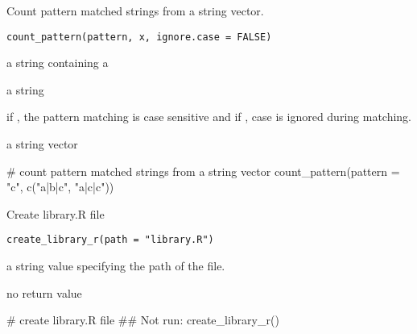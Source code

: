 \documentclass[letterpaper]{book}
\begin{document}
%
\begin{Description}
Count pattern matched strings from a string vector.
\end{Description}
%
\begin{Usage}
\begin{verbatim}
count_pattern(pattern, x, ignore.case = FALSE)
\end{verbatim}
\end{Usage}
%
\begin{Arguments}
\begin{ldescription}
\item[\code{pattern}] a string containing a 

\item[\code{x}] a string

\item[\code{ignore.case}] if , the pattern matching is case sensitive and if , case is ignored during matching.
\end{ldescription}
\end{Arguments}
%
\begin{Value}
a string vector
\end{Value}
%
\begin{Examples}
\begin{ExampleCode}
# count pattern matched strings from a string vector
count_pattern(pattern = "c", c("a|b|c", "a|c|c"))

\end{ExampleCode}
\end{Examples}
%
\begin{Description}
Create library.R file
\end{Description}
%
\begin{Usage}
\begin{verbatim}
create_library_r(path = "library.R")
\end{verbatim}
\end{Usage}
%
\begin{Arguments}
\begin{ldescription}
\item[\code{path}] a string value specifying the path of the file.
\end{ldescription}
\end{Arguments}
%
\begin{Value}
no return value
\end{Value}
%
\begin{Examples}
\begin{ExampleCode}
# create library.R file
## Not run: create_library_r()

\end{ExampleCode}
\end{Examples}
\end{document}
